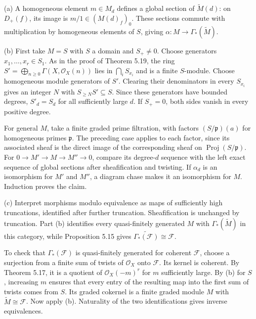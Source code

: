 (a) A homogeneous element $m\in M_d$ defines a global section of $\widetilde M(d)$: on $D_+(f)$, its image is $m/1\in(M(d)_f)_0$. These sections commute with multiplication by homogeneous elements of $S$, giving $\alpha:M\to\Gamma_*(\widetilde M)$.

(b) First take $M=S$ with $S$ a domain and $S_+\ne0$. Choose generators $x_1,\ldots,x_r\in S_1$. As in the proof of Theorem 5.19, the ring $S'=\bigoplus_{n\ge0}\Gamma(X,\mathcal O_X(n))$ lies in $\bigcap_iS_{x_i}$ and is a finite $S$-module. Choose homogeneous module generators of $S'$. Clearing their denominators in every $S_{x_i}$ gives an integer $N$ with $S_{\ge N}S'\subseteq S$. Since these generators have bounded degrees, $S'_d=S_d$ for all sufficiently large $d$. If $S_+=0$, both sides vanish in every positive degree.

For general $M$, take a finite graded prime filtration, with factors $(S/\mathfrak p)(a)$ for homogeneous primes $\mathfrak p$. The preceding case applies to each factor, since its associated sheaf is the direct image of the corresponding sheaf on $\operatorname{Proj}(S/\mathfrak p)$. For $0\to M'\to M\to M''\to0$, compare its degree-$d$ sequence with the left exact sequence of global sections after sheafification and twisting. If $\alpha_d$ is an isomorphism for $M'$ and $M''$, a diagram chase makes it an isomorphism for $M$. Induction proves the claim.

(c) Interpret morphisms modulo equivalence as maps of sufficiently high truncations, identified after further truncation. Sheafification is unchanged by truncation. Part (b) identifies every quasi-finitely generated $M$ with $\Gamma_*(\widetilde M)$ in this category, while Proposition 5.15 gives $\widetilde{\Gamma_*(\mathcal F)}\cong\mathcal F$.

To check that $\Gamma_*(\mathcal F)$ is quasi-finitely generated for coherent $\mathcal F$, choose a surjection from a finite sum of twists of $\mathcal O_X$ onto $\mathcal F$. Its kernel is coherent. By Theorem 5.17, it is a quotient of $\mathcal O_X(-m)^r$ for $m$ sufficiently large. By (b) for $S$, increasing $m$ ensures that every entry of the resulting map into the first sum of twists comes from $S$. Its graded cokernel is a finite graded module $M$ with $\widetilde M\cong\mathcal F$. Now apply (b). Naturality of the two identifications gives inverse equivalences.
